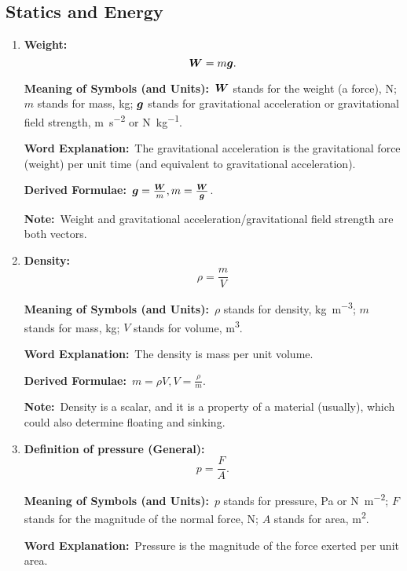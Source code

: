 \documentclass[8pt]{article}
\newcommand{\MeanSymb}{\textbf{Meaning of Symbols (and Units):}\ }
\newcommand{\WordExpl}{\textbf{Word Explanation:}\ }
\newcommand{\DeriForm}{\textbf{Derived Formulae:}\ }
\newcommand{\Note}{\textbf{Note:}\ }
\begin{document}
        \subsection{Statics and Energy}
            \begin{enumerate}
                \item \textbf{Weight:}
                \[
                    \boldsymbol{W} = m \boldsymbol{g}.
                \]

                \MeanSymb \(\boldsymbol{W}\) stands for the weight (a force), \unit{\newton}; \(m\) stands for mass, \unit{\kilogram}; \(\boldsymbol{g}\) stands for gravitational acceleration or gravitational field strength, \unit{\metre\per\second\squared} or \unit{\newton\per\kilogram}.

                \WordExpl The gravitational acceleration is the gravitational force (weight) per unit time (and equivalent to gravitational acceleration).

                \DeriForm \(\boldsymbol{g} = \frac{\boldsymbol{W}}{m}, m = \frac{\boldsymbol{W}}{\boldsymbol{g}}\).

                \Note Weight and gravitational acceleration/gravitational field strength are both vectors.

                \item \textbf{Density:}
                \[
                    \rho = \frac{m}{V}
                \]

                \MeanSymb \(\rho\) stands for density, \unit{\kilogram \per \metre\cubed}; \(m\) stands for mass, \unit{\kilogram}; \(V\) stands for volume, \unit{\metre\cubed}.

                \WordExpl The density is mass per unit volume.

                \DeriForm \(m = \rho V, V = \frac{\rho}{m}\).

                \Note Density is a scalar, and it is a property of a material (usually), which could also determine floating and sinking.
                
                \item \textbf{Definition of pressure (General):}
                \[
                    p = \frac{F}{A}.
                \]

                \MeanSymb \(p\) stands for pressure, \unit{\pascal} or \unit{\newton\per\metre\squared}; \(F\) stands for the magnitude of the normal force, \unit{\newton}; \(A\) stands for area, \unit{\metre\squared}.

                \WordExpl Pressure is the magnitude of the force exerted per unit area.


\end{enumerate}
\end{document}
